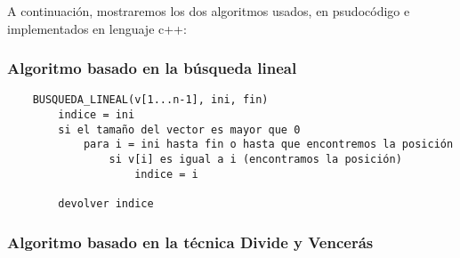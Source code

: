 A continuación, mostraremos los dos algoritmos usados, en psudocódigo e implementados en 
lenguaje c++: 

\subsubsection{Algoritmo basado en la búsqueda lineal}

\begin{lstlisting}
    BUSQUEDA_LINEAL(v[1...n-1], ini, fin)
        indice = ini
        si el tamaño del vector es mayor que 0
            para i = ini hasta fin o hasta que encontremos la posición
                si v[i] es igual a i (encontramos la posición)
                    indice = i

        devolver indice
\end{lstlisting}

% 

\subsubsection{Algoritmo basado en la técnica Divide y Vencerás}

\begin{lstlisting}
    
\end{lstlisting}



